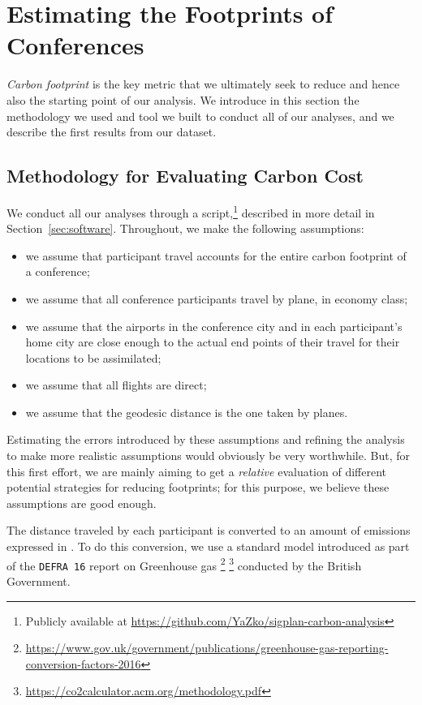 \section{Estimating the Footprints of Conferences}
\label{sec:footprint}

{\em Carbon footprint} is the key metric that we ultimately seek to reduce
and hence also the starting point of our analysis.  We introduce in this
section the methodology we used and tool we built to conduct all of our
analyses, and we describe the first results from our dataset.

\subsection{Methodology for Evaluating Carbon Cost}
\label{sec:methodo}

We conduct all our analyses through a \python{} script,\footnote{Publicly available at
  \url{https://github.com/YaZko/sigplan-carbon-analysis}} described in more detail in Section~\ref{sec:software}.
%
Throughout, we make the following assumptions:
\begin{itemize}
\item we assume that participant travel accounts for the entire carbon
footprint of a conference;
\item we assume that {all} conference participants travel by plane, in economy
class;
\item we assume that the airports in the conference city and in each
participant's home city are close enough to the actual end points of their
travel for their locations to be assimilated;
\item we assume that all flights are direct;
\item we assume that the geodesic distance is the one taken by planes.
\end{itemize}
Estimating the errors introduced by these assumptions and refining the
analysis to make more realistic assumptions would obviously be very
worthwhile.
%
But, for this first effort, we are mainly aiming to get a
{\em relative} evaluation of different potential strategies for reducing
footprints; for this purpose, we believe these assumptions are good enough.

The distance traveled by each participant is converted to an amount of
emissions expressed in \gaz. To do this conversion, we use a standard model
introduced as part of the \texttt{DEFRA 16} report on Greenhouse gas
\footnote{\url{https://www.gov.uk/government/publications/greenhouse-gas-reporting-conversion-factors-2016}}
\footnote{\url{https://co2calculator.acm.org/methodology.pdf}} conducted by
the British Government.

